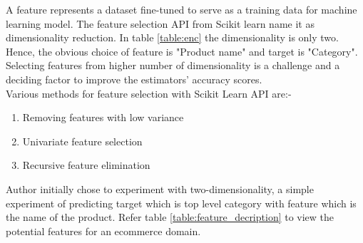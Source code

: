 A feature represents a dataset fine-tuned to serve as a training data for machine learning model. The feature selection API from Scikit learn \parencite{sklearn_api} name it as dimensionality reduction. In table \ref{table:enc} the dimensionality is only two. Hence, the obvious choice of feature is "Product name" and target is "Category". Selecting features from higher number of dimensionality is a challenge and a deciding factor to improve the estimators' accuracy scores.\\ 
Various methods for feature selection with Scikit Learn API are:-
\begin{enumerate}
      \item Removing features with low variance
      \item Univariate feature selection
      \item Recursive feature elimination

\end{enumerate}


 Author initially chose to experiment with two-dimensionality, a simple experiment of predicting target which is top level category with feature which is the name of the product. Refer table \ref{table:feature_decription} to view the potential features for an ecommerce domain. 




